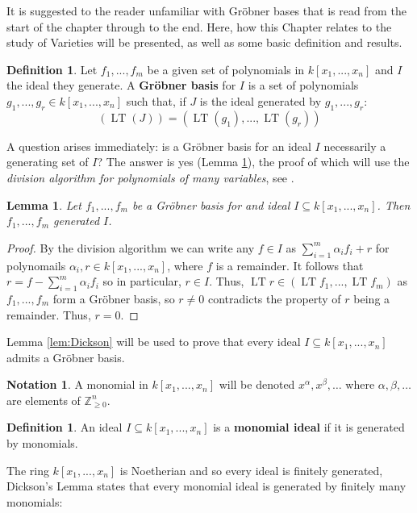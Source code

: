\documentclass[12pt]{article}
\theoremstyle{plain}
\newtheorem{lemma}[thm]{Lemma}
\theoremstyle{definition}
\newtheorem{defn}[thm]{Definition} %
\newtheorem{notation}[thm]{Notation}
\newcommand{\bb}[1]{\mathbb{#1}}
\begin{document}
It is suggested to the reader unfamiliar with Gr\"{o}bner bases that \cite[\S 2]{grobner} is read from the start of the chapter through to the end. Here, how this Chapter relates to the study of Varieties will be presented, as well as some basic definition and results.
\begin{defn}
Let $f_1,...,f_m$ be a given set of polynomials in $k[x_1,...,x_n]$ and $I$ the ideal they generate. A \textbf{Gr\"{o}bner basis} for $I$ is a set of polynomials $g_1,...,g_r \in k[x_1,...,x_n]$ such that, if $J$ is the ideal generated by $g_1,...,g_r$:
\begin{equation}
    (\operatorname{LT}(J)) = (\operatorname{LT}(g_1),...,\operatorname{LT}(g_r))
\end{equation}
\end{defn}
A question arises immediately: is a Gr\"{o}bner basis for an ideal $I$ necessarily a generating set of $I$? The answer is yes (Lemma \ref{lem:Grobner_is_basis}), the proof of which will use the \emph{division algorithm for polynomials of many variables}, see \cite[\S 2. 3 Theorem 3]{grobner}.
\begin{lemma}\label{lem:Grobner_is_basis}
Let $f_1,...,f_m$ be a Gr\"{o}bner basis for and ideal $I \subseteq k[x_1,...,x_n]$. Then $f_1,...,f_m$ generated $I$.
\end{lemma}
\begin{proof}
By the division algorithm we can write any $f \in I$ as $\sum_{i = 1}^m \alpha_i f_i + r$ for polynomails $\alpha_i,r \in k[x_1,...,x_n]$, where $f$ is a remainder. It follows that $r = f - \sum_{i = 1}^m \alpha_i f_i$ so in particular, $r \in I$. Thus, $\operatorname{LT}r \in (\operatorname{LT}f_1,...,\operatorname{LT}f_m)$ as $f_1,...,f_m$ form a Gr\"{o}bner basis, so $r \neq 0$ contradicts the property of $r$ being a remainder. Thus, $r = 0$.
\end{proof}
Lemma \ref{lem:Dickson} will be used to prove that every ideal $I \subseteq k[x_1,...,x_n]$ admits a Gr\"{o}bner basis.
\begin{notation}
A monomial in $k[x_1,...,x_n]$ will be denoted $x^\alpha, x^\beta,\hdots$ where $\alpha,\beta,\hdots$ are elements of $\bb{Z}_{\geq 0}^n$.
\end{notation}
\begin{defn}
An ideal $I \subseteq k[x_1,...,x_n]$ is a \textbf{monomial ideal} if it is generated by monomials.
\end{defn}
The ring $k[x_1,...,x_n]$ is Noetherian and so every ideal is finitely generated, Dickson's Lemma states that every monomial ideal is generated by finitely many monomials:
\end{document}
